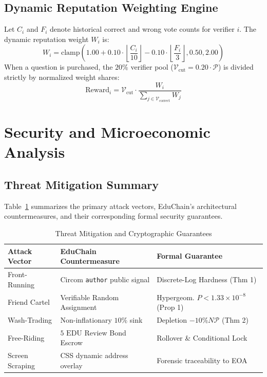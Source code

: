 \documentclass[conference,10pt]{IEEEtran}
\begin{document}
\subsection{Dynamic Reputation Weighting Engine}
Let $C_i$ and $F_i$ denote historical correct and wrong vote counts for verifier $i$. The dynamic reputation weight $W_i$ is:
\begin{equation}
    W_i = \text{clamp}\left(1.00 + 0.10 \cdot \left\lfloor\frac{C_i}{10}\right\rfloor - 0.10 \cdot \left\lfloor\frac{F_i}{3}\right\rfloor, 0.50, 2.00\right)
\end{equation}
When a question is purchased, the $20\%$ verifier pool ($\mathcal{V}_{\text{cut}} = 0.20 \cdot \mathcal{P}$) is divided strictly by normalized weight shares:
\begin{equation}
    \text{Reward}_i = \mathcal{V}_{\text{cut}} \cdot \frac{W_i}{\sum_{j \in \mathcal{V}_{\text{correct}}} W_j}
\end{equation}

\section{Security and Microeconomic Analysis}

\subsection{Threat Mitigation Summary}
Table~\ref{tab:threat_mitigation} summarizes the primary attack vectors, EduChain's architectural countermeasures, and their corresponding formal security guarantees.

\begin{table}[h]
\caption{Threat Mitigation and Cryptographic Guarantees}
\label{tab:threat_mitigation}
\centering
\begin{tabularx}{\linewidth}{lXX}
\toprule
\textbf{Attack Vector} & \textbf{EduChain Countermeasure} & \textbf{Formal Guarantee} \\
\midrule
Front-Running & Circom \texttt{author} public signal & Discrete-Log Hardness (Thm 1) \\
\addlinespace
Friend Cartel & Verifiable Random Assignment & Hypergeom. $P < 1.33 \times 10^{-8}$ (Prop 1) \\
\addlinespace
Wash-Trading & Non-inflationary $10\%$ sink & Depletion $-10\% N \mathcal{P}$ (Thm 2) \\
\addlinespace
Free-Riding & $5\text{ EDU}$ Review Bond Escrow & Rollover \& Conditional Lock \\
\addlinespace
Screen Scraping & CSS dynamic address overlay & Forensic traceability to EOA \\
\bottomrule
\end{tabularx}
\end{table}
\end{document}
